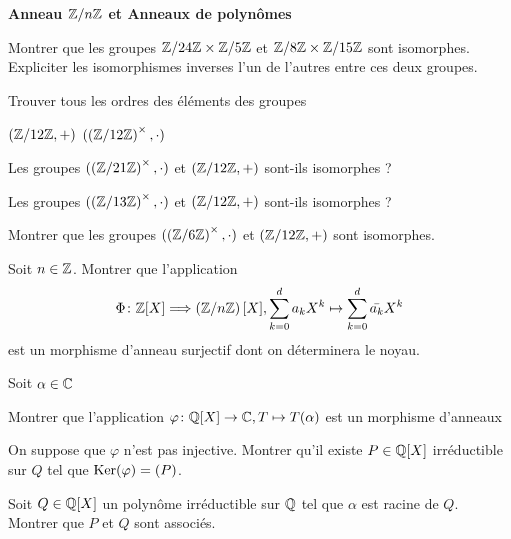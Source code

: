 \documentclass{report}
\begin{document}
\begin{center}
    \huge{\textbf{Anneau \(\mathbb{Z}/n\mathbb{Z}\) et Anneaux de polynômes}}
\end{center}

\begin{exo}
    Montrer que les groupes \(\mathbb{Z}/24\mathbb{Z}\times\mathbb{Z}/5\mathbb{Z}\) et \(\mathbb{Z}/8\mathbb{Z}\times\mathbb{Z}/15\mathbb{Z}\)
    sont isomorphes. Expliciter les isomorphismes inverses l'un de l'autres
    entre ces deux groupes.
\end{exo}

\begin{exo}
    Trouver tous les ordres des éléments des groupes
    \begin{enumerate}
        \itt \(\left(\mathbb{Z}/12\mathbb{Z}, +\right)\)
        \itt \((\left(\mathbb{Z}/12\mathbb{Z}\right)^{\times}, \cdot)\)
    \end{enumerate}
\end{exo}

\begin{exo}
    \begin{q}{1}
        Les groupes \((\left(\mathbb{Z}/21\mathbb{Z}\right)^\times,\cdot)\) et
        \(\left(\mathbb{Z}/12\mathbb{Z}, +\right)\) sont-ils isomorphes ?
    \end{q}
    \begin{q}{2}
        Les groupes \((\left(\mathbb{Z}/13\mathbb{Z}\right)^\times,\cdot)\) et
        \(\left(\mathbb{Z}/12\mathbb{Z}, +\right)\) sont-ils isomorphes ?
    \end{q}
    \begin{q}{3}
        Montrer que les groupes \((\left(\mathbb{Z}/6\mathbb{Z}\right)^\times,\cdot)\)
        et \(\left(\mathbb{Z}/12\mathbb{Z}, +\right)\) sont isomorphes.
    \end{q}
\end{exo}

\begin{exo}
    Soit \(n\in\mathbb{Z}\). Montrer que l'application
    \[\Phi\colon\mathbb{Z}[X]\Longrightarrow\left(\mathbb{Z}/n\mathbb{Z}\right)[X],
    \sum_{k=0}^da_kX^k\mapsto\sum_{k=0}^d\bar{a_k}X^k\]
    est un morphisme d'anneau surjectif dont on déterminera le noyau.
\end{exo}

\begin{exo}
    Soit \(\alpha\in\mathbb{C}\)
    \begin{q}{1}
        Montrer que l'application \(\varphi\colon\mathbb{Q}[X]\to\mathbb{C},T\mapsto T(\alpha)\)
        est un morphisme d'anneaux
    \end{q}
    \begin{q}{2}
        On suppose que \(\varphi\) n'est pas injective. Montrer qu'il existe \(P\in\mathbb{Q}[X]\)
        irréductible sur \(Q\) tel que \(\operatorname{Ker}(\varphi)=(P)\).
    \end{q}
    \begin{q}{3}
        Soit \(Q\in\mathbb{Q}[X]\) un polynôme irréductible sur \(\mathbb{Q}\) tel que \(\alpha\) est
        racine de \(Q\). Montrer que \(P\) et \(Q\) sont associés.
    \end{q}
\end{exo}
\end{document}
